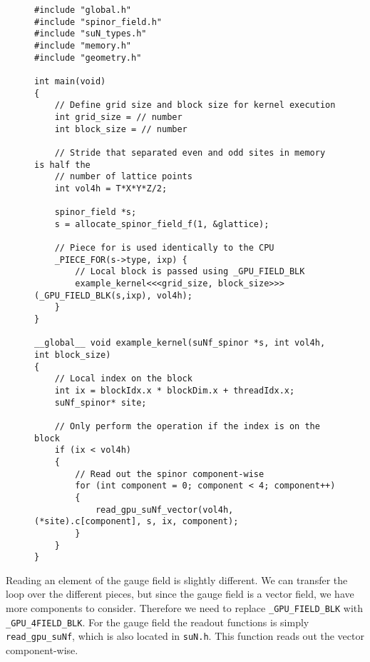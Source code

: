 \documentclass[12pt]{article}
\begin{document}
\begin{figure}[H]
\begin{lstlisting}[caption=Example for reading the field values of a spinor]
#include "global.h"
#include "spinor_field.h"
#include "suN_types.h"
#include "memory.h"
#include "geometry.h"

int main(void) 
{
    // Define grid size and block size for kernel execution
    int grid_size = // number
    int block_size = // number
    
    // Stride that separated even and odd sites in memory is half the 
    // number of lattice points
    int vol4h = T*X*Y*Z/2;
    
    spinor_field *s;
    s = allocate_spinor_field_f(1, &glattice);
    
    // Piece for is used identically to the CPU
    _PIECE_FOR(s->type, ixp) {
        // Local block is passed using _GPU_FIELD_BLK
        example_kernel<<<grid_size, block_size>>>(_GPU_FIELD_BLK(s,ixp), vol4h);
    }
}

__global__ void example_kernel(suNf_spinor *s, int vol4h, int block_size) 
{
    // Local index on the block
    int ix = blockIdx.x * blockDim.x + threadIdx.x;
    suNf_spinor* site;

    // Only perform the operation if the index is on the block
    if (ix < vol4h) 
    {
        // Read out the spinor component-wise
        for (int component = 0; component < 4; component++) 
        {
            read_gpu_suNf_vector(vol4h, (*site).c[component], s, ix, component);
        }
    }
}
\end{lstlisting}
\end{figure}

Reading an element of the gauge field is slightly different. We can transfer the loop over the different pieces, but since the gauge field is a vector field, we have more components to consider. Therefore we need to replace \texttt{\_GPU\_FIELD\_BLK} with \texttt{\_GPU\_4FIELD\_BLK}. For the gauge field the readout functions is simply \texttt{read\_gpu\_suNf}, which is also located in \texttt{suN.h}. This function reads out the vector component-wise.
\end{document}
